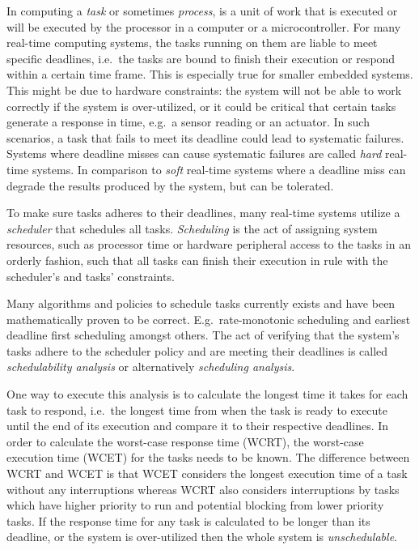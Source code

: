 In computing a \emph{task} or sometimes \emph{process}, is a unit of work that
is executed or will be executed by the processor in a computer or a
microcontroller.  For many real-time computing systems, the tasks running on
them are liable to meet specific deadlines, i.e.\ the tasks are bound to finish
their execution or respond within a certain time frame. This is especially true
for smaller embedded systems. This might be due to hardware constraints: the
system will not be able to work correctly if the system is over-utilized, or it
could be critical that certain tasks generate a response in time, e.g.\ a
sensor reading or an actuator. In such scenarios, a task that fails to meet its
deadline could lead to systematic failures. Systems where deadline misses can
cause systematic failures are called \emph{hard} real-time systems. In
comparison to \emph{soft} real-time systems where a deadline miss can degrade
the results produced by the system, but can be tolerated.

To make sure tasks adheres to their deadlines, many real-time systems utilize
a \emph{scheduler} that schedules all tasks. \emph{Scheduling} is the act of
assigning system resources, such as processor time or hardware peripheral
access to the tasks in an orderly fashion, such that all tasks can finish their
execution in rule with the scheduler's and tasks' constraints.

Many algorithms and policies to schedule tasks currently exists and have been
mathematically proven to be correct.  E.g.\ rate-monotonic
scheduling\cite{ratemonotonic} and earliest deadline first scheduling\cite{edf}
amongst others.  The act of verifying that the system's tasks adhere to the
scheduler policy and are meeting their deadlines is called \emph{schedulability
analysis} or alternatively \emph{scheduling analysis}.

One way to execute this analysis is to calculate the longest time it takes for
each task to respond, i.e.\ the longest time from when the task is ready to
execute until the end of its execution and compare it to their respective
deadlines.  In order to calculate the worst-case response time (WCRT), the
worst-case execution time (WCET) for the tasks needs to be known. The
difference between WCRT and WCET is that WCET considers the longest execution
time of a task without any interruptions whereas WCRT also considers
interruptions by tasks which have higher priority to
run and potential blocking from lower priority
tasks\cite{hardrealtimecomputingsystems}. If the response time for any task is
calculated to be longer than its deadline, or the system is over-utilized then
the whole system is \emph{unschedulable}.

